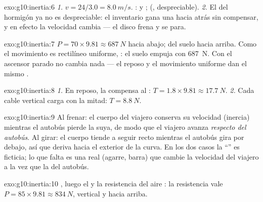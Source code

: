 \begin{solution}{exo:g10:inertia:6}
\emph{1.} $v = 24/3.0 = \qty{8.0}{m/s}$. :  y ;  (, 
despreciable). \emph{2.} El  del hormigón ya no es
despreciable: el inventario gana una  hacia atrás sin compensar,
y en efecto la velocidad cambia --- el disco frena y se para.
\end{solution}

\begin{solution}{exo:g10:inertia:7}
 $P = 70 \times 9.81 \approx \qty{687}{N}$ hacia abajo;  del
suelo hacia arriba. Como el movimiento es rectilíneo uniforme, : el suelo empuja con \qty{687}{N}. Con el ascensor parado no
cambia nada --- el reposo y el movimiento uniforme dan el mismo .
\end{solution}

\begin{solution}{exo:g10:inertia:8}
\emph{1.} En reposo, la  compensa al :
$T = 1.8 \times 9.81 \approx \qty{17.7}{N}$. \emph{2.} Cada cable
vertical carga con la mitad: $T = \qty{8.8}{N}$.
\end{solution}

\begin{solution}{exo:g10:inertia:9}
Al frenar: el cuerpo del viajero conserva su velocidad (inercia)
mientras el autobús pierde la suya, de modo que el viajero avanza
\emph{respecto del autobús}. Al girar: el cuerpo tiende a seguir recto
mientras el autobús gira por debajo, así que deriva hacia el exterior de
la curva. En los dos casos la ``'' es ficticia; lo que falta es
una  real (agarre, barra) que cambie la velocidad del viajero a la
vez que la del autobús.
\end{solution}

\begin{solution}{exo:g10:inertia:10}
, luego el  y la resistencia del aire
: la resistencia vale
$P = 85 \times 9.81 \approx \qty{834}{N}$, vertical y hacia arriba.
\end{solution}

